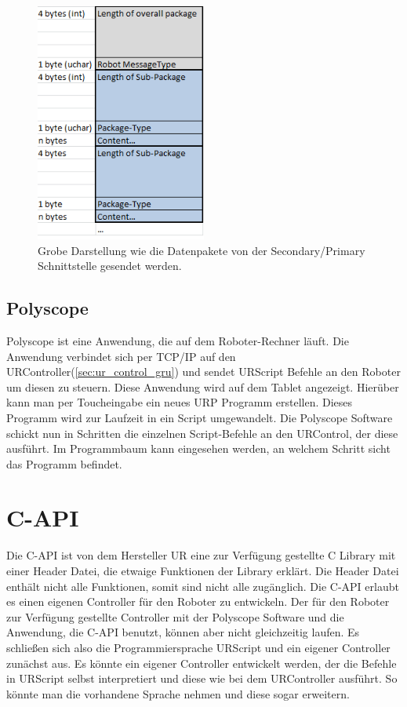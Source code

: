 \begin{figure}[H]
  \centering
    \includegraphics[width=0.5\textwidth]{pic/secondary_datapackage_scheme.png}
      \caption[Schema des Datenpakets gesendet von der Secondary Schnittstelle]{Grobe Darstellung wie die Datenpakete von der Secondary/Primary Schnittstelle gesendet werden.}
      \label{fig:datascheme_of_secondary_interface}
\end{figure}

\subsection{Polyscope}
\label{urcontrol_polyscope_gru}

Polyscope ist eine Anwendung, die auf dem Roboter-Rechner läuft. Die Anwendung verbindet sich per \acs{TCP/IP} auf den URController(\ref{sec:ur_control_gru}) und sendet URScript Befehle an den Roboter um diesen zu steuern.
Diese Anwendung wird auf dem Tablet angezeigt. Hierüber kann man per Toucheingabe ein neues \acs{URP} Programm erstellen. Dieses Programm wird zur Laufzeit in ein Script umgewandelt. Die Polyscope Software schickt nun in Schritten die einzelnen Script-Befehle an den URControl, der diese ausführt. Im Programmbaum kann eingesehen werden, an welchem Schritt sicht das Programm befindet.

\section{C-API}
\label{sec:rest_prinzip_gru}

Die C-\ac{API} ist von dem Hersteller \acs{UR} eine zur Verfügung gestellte C \acs{Library} mit einer Header Datei, die etwaige Funktionen der Library erklärt. Die Header Datei enthält nicht alle Funktionen, somit sind nicht alle zugänglich. Die C-\acs{API} erlaubt es einen eigenen Controller für den Roboter zu entwickeln. Der für den Roboter zur Verfügung gestellte Controller mit der Polyscope Software und die Anwendung, die C-\acs{API} benutzt, können aber nicht gleichzeitig laufen. Es schließen sich also die Programmiersprache URScript und ein eigener Controller zunächst aus. Es könnte ein eigener Controller entwickelt werden, der die Befehle in URScript selbst interpretiert und diese wie bei dem URController ausführt. So könnte man die vorhandene Sprache nehmen und diese sogar erweitern.


